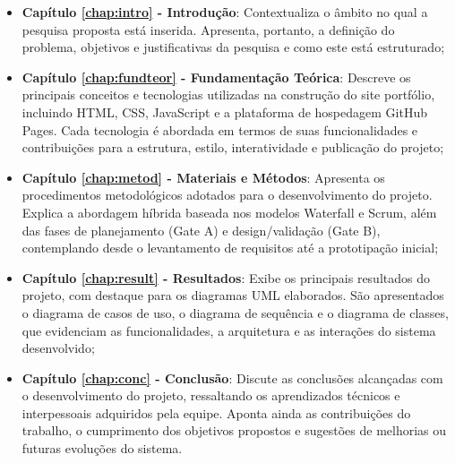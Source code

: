 \begin{itemize}

\item \textbf{Capítulo \ref{chap:intro} - Introdução}: Contextualiza o âmbito no qual a pesquisa proposta está inserida. Apresenta, portanto, a definição do problema, objetivos e justificativas da pesquisa e como este \thetypeworkthree está estruturado;

\item \textbf{Capítulo \ref{chap:fundteor} - Fundamentação Teórica}: Descreve os principais conceitos e tecnologias utilizadas na construção do site portfólio, incluindo HTML, CSS, JavaScript e a plataforma de hospedagem GitHub Pages. Cada tecnologia é abordada em termos de suas funcionalidades e contribuições para a estrutura, estilo, interatividade e publicação do projeto;

\item \textbf{Capítulo \ref{chap:metod} - Materiais e Métodos}: Apresenta os procedimentos metodológicos adotados para o desenvolvimento do projeto. Explica a abordagem híbrida baseada nos modelos Waterfall e Scrum, além das fases de planejamento (Gate A) e design/validação (Gate B), contemplando desde o levantamento de requisitos até a prototipação inicial;

\item \textbf{Capítulo \ref{chap:result} - Resultados}: Exibe os principais resultados do projeto, com destaque para os diagramas UML elaborados. São apresentados o diagrama de casos de uso, o diagrama de sequência e o diagrama de classes, que evidenciam as funcionalidades, a arquitetura e as interações do sistema desenvolvido;

\item \textbf{Capítulo \ref{chap:conc} - Conclusão}: Discute as conclusões alcançadas com o desenvolvimento do projeto, ressaltando os aprendizados técnicos e interpessoais adquiridos pela equipe. Aponta ainda as contribuições do trabalho, o cumprimento dos objetivos propostos e sugestões de melhorias ou futuras evoluções do sistema.

\end{itemize}


